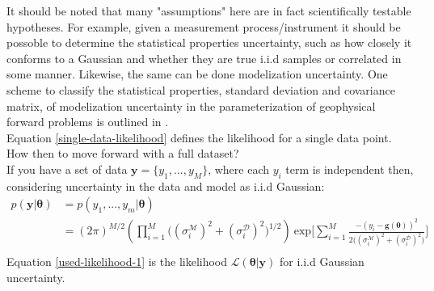 It should be noted that many "assumptions" here are in fact scientifically testable hypotheses. For example, given a measurement process/instrument it should be possoble to determine the statistical properties uncertainty, such as how closely it conforms to a Gaussian and whether they are true i.i.d samples or correlated in some manner. Likewise, the same can be done modelization uncertainty. One scheme to classify the statistical properties, standard deviation and covariance matrix, of modelization uncertainty in the parameterization of geophysical forward problems is outlined in \citep{afonso2013b}.\\

Equation \ref{single-data-likelihood} defines the likelihood for a single data point. How then to move forward with a full dataset?\\

If you have a set of data $\bm{y} = \{y_1,...,y_M\}$, where each $y_i$ term is independent then, considering uncertainty in the data and model as i.i.d Gaussian:
\begin{equation}
\begin{split}
p(\bm{y}|\bm{\theta}) &= p(y_1,...,y_m|\bm{\theta})\\
&= (2\pi)^{M/2}(\prod_{i = 1}^{M}\big((\sigma^{\mathcal{M}}_i)^2+(\sigma^{\mathcal{D}}_i)^2\big)^{1/2})\ \text{exp}\bigg[\sum_{i = 1}^{M}\frac{-(y_i-\bm{g}({\bm{\theta}}))^2}{2\big((\sigma^{\mathcal{M}}_i)^2+(\sigma^{\mathcal{D}}_i)^2\big)}\bigg]\\
\label{used-likelihood-1}
\end{split}
\end{equation}
Equation \ref{used-likelihood-1} is the likelihood $\mathcal{L}(\bm{\theta}|\bm{y})$ for i.i.d Gaussian uncertainty.\\ 

